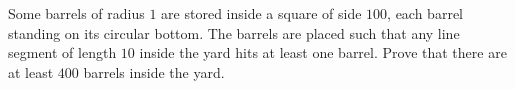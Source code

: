 Some barrels of radius $1$ are stored inside a square of side $100$, each barrel standing on its circular bottom. The barrels are placed such that any line segment of length $10$ inside the yard hits at least one barrel. Prove that there are at least $400$ barrels inside the yard.
